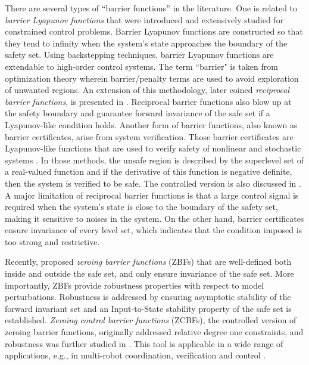 \documentclass[letterpaper, 10 pt, journal, twoside]{IEEEtran}
\theoremstyle{plain}
\begin{document}
There are {several types of} ``barrier functions'' in the literature. One is related to  \textit{barrier Lyapunov functions} \cite{tee2009barrier} that were introduced  and extensively studied for constrained control problems. Barrier Lyapunov functions are constructed {so that they} tend to infinity when the {system's} state approaches the {boundary of the safety set}. Using backstepping techniques, barrier Lyapunov functions are {extendable} to high-order control systems.  The term ``barrier" is taken from  {optimization} theory \cite{boyd2004convex} {wherein} barrier/penalty terms {are used} to avoid exploration of unwanted regions.  An extension of this methodology, later {coined} \textit{reciprocal barrier functions}\cite{Ames2017}, is presented in \cite{Ames2014}. Reciprocal barrier functions also blow up at the safety boundary and guarantee forward invariance of the safe set if a Lyapunov-like condition holds. Another form of barrier functions, also known as barrier certificates, arise from system verification. {Those barrier certificates are} Lyapunov-like functions {that are used} to verify safety of nonlinear and stochastic systems \cite{prajna2006barrier,prajna2007framework}. In {those methods}, the unsafe region is described by the superlevel set  of a real-valued function and if the derivative of this function is negative definite, then the system is verified to be safe. The controlled version is also discussed in \cite{wieland2007constructive}. {A major} limitation of  reciprocal barrier functions is that {a large control signal is required} when the {system's} state is close to the boundary of the safety set, making it sensitive to noises in the system. {On the other hand, barrier certificates ensure invariance of every level set}, which indicates that the condition imposed is too strong and restrictive. 


{Recently}, \cite{Xu2015a,Ames2017} proposed \textit{zeroing barrier functions} (ZBFs) that are well-defined both inside and outside the safe set, and only {ensure} invariance of the safe set. More importantly,  ZBFs provide robustness properties with respect to model perturbations. {Robustness} is {addressed} by {ensuring} asymptotic stability of the forward invariant set and an Input-to-State stability property of the safe set is established. \textit{Zeroing control barrier functions} (ZCBFs), the controlled version of zeroing barrier functions, { originally addressed} relative degree one constraints, and {robustness was further studied in} \cite{jankovic2018robust}. This tool is applicable in a wide range of applications, e.g., in  multi-robot coordination, verification and control \cite{glotfelter2017nonsmooth,Wang2017a,lindemann2018control}.
  
\end{document}
